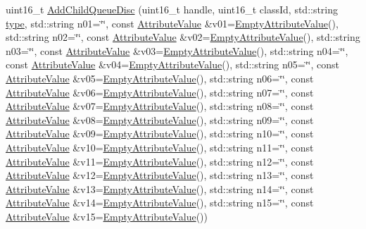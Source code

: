 \begin{DoxyCompactItemize}
uint16\+\_\+t \hyperlink{classns3_1_1TrafficControlHelper_a2a128a73e2ba7d1a9a1b316d6db772ab}{Add\+Child\+Queue\+Disc} (uint16\+\_\+t handle, uint16\+\_\+t class\+Id, std\+::string \hyperlink{visualizer-ideas_8txt_add98db9e15e2a58cf2b57623e7aa893a}{type}, std\+::string n01=\char`\"{}\char`\"{}, const \hyperlink{classns3_1_1AttributeValue}{Attribute\+Value} \&v01=\hyperlink{classns3_1_1EmptyAttributeValue}{Empty\+Attribute\+Value}(), std\+::string n02=\char`\"{}\char`\"{}, const \hyperlink{classns3_1_1AttributeValue}{Attribute\+Value} \&v02=\hyperlink{classns3_1_1EmptyAttributeValue}{Empty\+Attribute\+Value}(), std\+::string n03=\char`\"{}\char`\"{}, const \hyperlink{classns3_1_1AttributeValue}{Attribute\+Value} \&v03=\hyperlink{classns3_1_1EmptyAttributeValue}{Empty\+Attribute\+Value}(), std\+::string n04=\char`\"{}\char`\"{}, const \hyperlink{classns3_1_1AttributeValue}{Attribute\+Value} \&v04=\hyperlink{classns3_1_1EmptyAttributeValue}{Empty\+Attribute\+Value}(), std\+::string n05=\char`\"{}\char`\"{}, const \hyperlink{classns3_1_1AttributeValue}{Attribute\+Value} \&v05=\hyperlink{classns3_1_1EmptyAttributeValue}{Empty\+Attribute\+Value}(), std\+::string n06=\char`\"{}\char`\"{}, const \hyperlink{classns3_1_1AttributeValue}{Attribute\+Value} \&v06=\hyperlink{classns3_1_1EmptyAttributeValue}{Empty\+Attribute\+Value}(), std\+::string n07=\char`\"{}\char`\"{}, const \hyperlink{classns3_1_1AttributeValue}{Attribute\+Value} \&v07=\hyperlink{classns3_1_1EmptyAttributeValue}{Empty\+Attribute\+Value}(), std\+::string n08=\char`\"{}\char`\"{}, const \hyperlink{classns3_1_1AttributeValue}{Attribute\+Value} \&v08=\hyperlink{classns3_1_1EmptyAttributeValue}{Empty\+Attribute\+Value}(), std\+::string n09=\char`\"{}\char`\"{}, const \hyperlink{classns3_1_1AttributeValue}{Attribute\+Value} \&v09=\hyperlink{classns3_1_1EmptyAttributeValue}{Empty\+Attribute\+Value}(), std\+::string n10=\char`\"{}\char`\"{}, const \hyperlink{classns3_1_1AttributeValue}{Attribute\+Value} \&v10=\hyperlink{classns3_1_1EmptyAttributeValue}{Empty\+Attribute\+Value}(), std\+::string n11=\char`\"{}\char`\"{}, const \hyperlink{classns3_1_1AttributeValue}{Attribute\+Value} \&v11=\hyperlink{classns3_1_1EmptyAttributeValue}{Empty\+Attribute\+Value}(), std\+::string n12=\char`\"{}\char`\"{}, const \hyperlink{classns3_1_1AttributeValue}{Attribute\+Value} \&v12=\hyperlink{classns3_1_1EmptyAttributeValue}{Empty\+Attribute\+Value}(), std\+::string n13=\char`\"{}\char`\"{}, const \hyperlink{classns3_1_1AttributeValue}{Attribute\+Value} \&v13=\hyperlink{classns3_1_1EmptyAttributeValue}{Empty\+Attribute\+Value}(), std\+::string n14=\char`\"{}\char`\"{}, const \hyperlink{classns3_1_1AttributeValue}{Attribute\+Value} \&v14=\hyperlink{classns3_1_1EmptyAttributeValue}{Empty\+Attribute\+Value}(), std\+::string n15=\char`\"{}\char`\"{}, const \hyperlink{classns3_1_1AttributeValue}{Attribute\+Value} \&v15=\hyperlink{classns3_1_1EmptyAttributeValue}{Empty\+Attribute\+Value}())

\end{DoxyCompactItemize}
